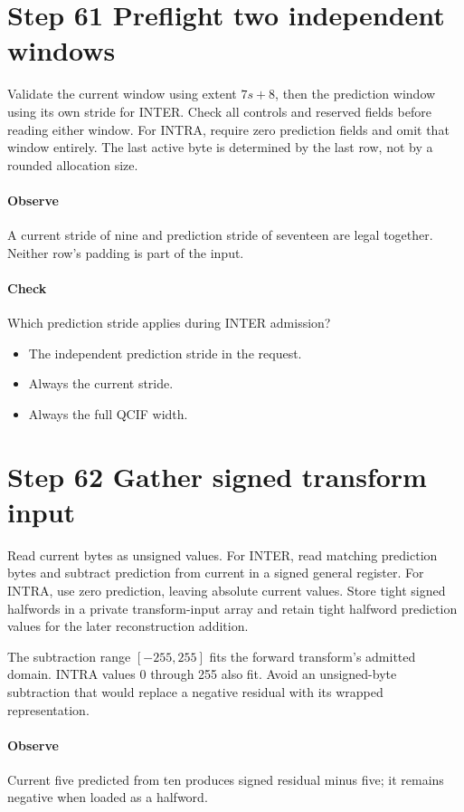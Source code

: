 \section{Step 61 Preflight two independent windows}\label{h263-block-s01}
Validate the current window using extent $7s+8$, then the prediction window
using its own stride for INTER. Check all controls and reserved fields before
reading either window. For INTRA, require zero prediction fields and omit that
window entirely. The last active byte is determined by the last row, not by a
rounded allocation size.

\paragraph{Observe} A current stride of nine and prediction stride of seventeen
are legal together. Neither row's padding is part of the input.
\paragraph{Check} Which prediction stride applies during INTER admission?
\begin{itemize}
  \item[A.] The independent prediction stride in the request.
  \item[B.] Always the current stride.
  \item[C.] Always the full QCIF width.
\end{itemize}

\section{Step 62 Gather signed transform input}\label{h263-block-s02}
Read current bytes as unsigned values. For INTER, read matching prediction bytes
and subtract prediction from current in a signed general register. For INTRA,
use zero prediction, leaving absolute current values. Store tight signed halfwords
in a private transform-input array and retain tight halfword prediction values
for the later reconstruction addition.

The subtraction range $[-255,255]$ fits the forward transform's admitted domain.
INTRA values 0 through 255 also fit. Avoid an unsigned-byte subtraction that
would replace a negative residual with its wrapped representation.

\paragraph{Observe} Current five predicted from ten produces signed residual
minus five; it remains negative when loaded as a halfword.
